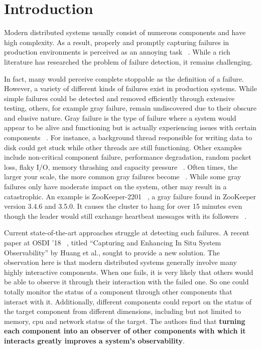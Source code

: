 \section{Introduction}
Modern distributed systems usually consist of numerous components and have high complexity. As a result, properly and promptly capturing failures in production environments is perceived as an annoying task ~\cite{dean2009designs, liu2007wids}. While a rich literature has researched the problem of failure detection, it remains challenging.

In fact, many would perceive complete stoppable as the definition of a failure. However, a variety of different kinds of failures exist in production systems. While simple failures could be detected and removed efficiently through extensive testing, others, for example gray failure, remain undiscovered due to their obscure and elusive nature. Gray failure is the type of failure where a system would appear to be alive and functioning but is actually experiencing issues with certain components ~\cite{huang2017gray}. For instance, a background thread responsible for writing data to disk could get stuck while other threads are still functioning. Other examples include non-critical component failure, performance degradation, random packet loss, flaky I/O, memory thrashing and capacity pressure ~\cite{huang2017gray}. Often times, the larger your scale, the more common gray failures become ~\cite{Grayfail28:online}. While some gray failures only have moderate impact on the system, other may result in a catastrophic. An example is ZooKeeper-2201 ~\cite{httpsiss99:online}, a gray failure found in ZooKeeper version 3.4.6 and 3.5.0. It causes the cluster to hang for over 15 minutes even though the leader would still exchange heartbeat messages with its followers ~\cite{beschastnikh2016debugging}. 

Current state-of-the-art approaches struggle at detecting such failures. A recent paper at OSDI '18 ~\cite{huang2018capturing}, titled ``Capturing and Enhancing In Situ System Observability'' by Huang et al., sought to provide a new solution. The observation here is that modern distributed systems generally involve many highly interactive components. When one fails, it is very likely that others would be able to observe it through their interaction with the failed one. So one could totally monitor the status of a component through other components that interact with it. Additionally, different components could report on the status of the target component from different dimensions, including but not limited to memory, cpu and network status of the target. The authors find that \textbf{turning each component into an observer of other components with which it interacts greatly improves a system's observability}. 

